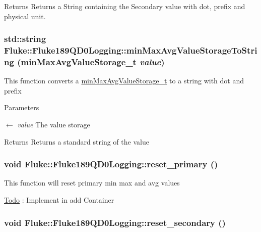 \label{classFluke_1_1Fluke189QD0Logging_a5e36bbcb7bc5c45ffaf099af76c46d7e}
\begin{DoxyReturn}{Returns}
Returns a String containing the Secondary value with dot, prefix and physical unit. 
\end{DoxyReturn}
\hypertarget{classFluke_1_1Fluke189QD0Logging_a328f1e4b632082f62d461fd4ba6eb838}{
\subsubsection[{minMaxAvgValueStorageToString}]{\setlength{\rightskip}{0pt plus 5cm}std::string Fluke::Fluke189QD0Logging::minMaxAvgValueStorageToString ({\bf minMaxAvgValueStorage\_\-t} {\em value})}}
\label{classFluke_1_1Fluke189QD0Logging_a328f1e4b632082f62d461fd4ba6eb838}
This function converts a \hyperlink{structFluke_1_1Fluke189QD0Logging_1_1minMaxAvgValueStorage__t}{minMaxAvgValueStorage\_\-t} to a string with dot and prefix 
\begin{DoxyParams}{Parameters}
\item[\mbox{$\leftarrow$} {\em value}]The value storage \end{DoxyParams}
\begin{DoxyReturn}{Returns}
Returns a standard string of the value 
\end{DoxyReturn}
\hypertarget{classFluke_1_1Fluke189QD0Logging_a610c90f3ad529040eaf5aeb7195fe1bd}{
\subsubsection[{reset\_\-primary}]{\setlength{\rightskip}{0pt plus 5cm}void Fluke::Fluke189QD0Logging::reset\_\-primary ()}}
\label{classFluke_1_1Fluke189QD0Logging_a610c90f3ad529040eaf5aeb7195fe1bd}
This function will reset primary min max and avg values \begin{Desc}
\item[\hyperlink{todo__todo000023}{Todo}]: Implement in add Container \end{Desc}
\hypertarget{classFluke_1_1Fluke189QD0Logging_ac5205e2183bdfffcd46229b71baeb3fb}{
\subsubsection[{reset\_\-secondary}]{\setlength{\rightskip}{0pt plus 5cm}void Fluke::Fluke189QD0Logging::reset\_\-secondary ()}}
